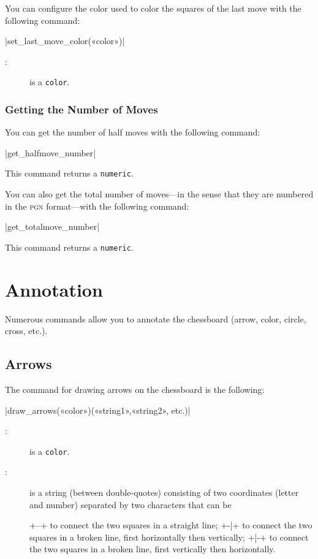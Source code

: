 \documentclass[english]{ltxdoc}
\begin{document}
You can configure the color used to color the squares of the last
move with the following command:

\commande|set_last_move_color(«color»)|\smallskip
\begin{description}
  \item[:] is a \MP{} \lstinline+color+.
\end{description}



\subsubsection{Getting the Number of Moves}

You can get the number of half moves with the following command:

\commande|get_halfmove_number|\smallskip

This command returns a \lstinline+numeric+.

You can also get the total number of moves---in the sense that they are numbered
in the \textsc{pgn} format---with the following command:

\commande|get_totalmove_number|\smallskip

This command returns a \lstinline+numeric+.

\section{Annotation}

Numerous commands allow you to annotate the chessboard (arrow, color, circle, cross,
etc.).

\subsection{Arrows}

The command for drawing arrows on the chessboard is the following:

\commande|draw_arrows(«color»)(«string1»,«string2», etc.)|\smallskip
\begin{description}
\item[:] is a \MP{} \lstinline+color+.
\item[:] is a string (between double-quotes) consisting of two
coordinates (letter and number) separated by two characters that can be 
\begin{description}
\vitem+--+ to connect the two squares in a straight line;
\vitem+-|+ to connect the two squares in a broken line, first horizontally then
vertically; 
\vitem+|-+ to connect the two squares in a broken line, first vertically then
horizontally. 
\end{description}
\end{description}
\end{document}
